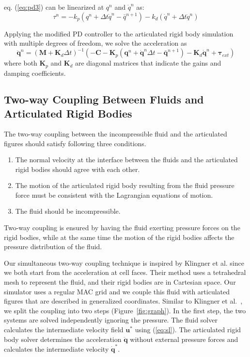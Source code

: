 eq. (\ref{eq:pd3}) can be linearized at $q^n$ and $\dot{q}^n$ as:
\begin{displaymath}
\tau^n=-k_p(q^n+\Delta t\dot{q}^n-\bar{q}^{n+1})-k_d(\dot{q}^n+\Delta t\ddot{q}^n)
\end{displaymath}

Applying the modified PD controller to the articulated rigid body simulation with multiple degrees of freedom, we solve the acceleration as
\begin{displaymath}
\label{eq:modifiedDynamics}
\mathbf{\ddot{q}}^n=(\mathbf{M}+\mathbf{K}_d\Delta t)^{-1}(-\mathbf{C}-\mathbf{K}_p(\mathbf{q}^n+\mathbf{\dot{q}}^n\Delta t-\bar{\mathbf{q}}^{n+1})-\mathbf{K}_d\mathbf{\dot{q}}^n+\mathbf{\tau}_{ext})
\end{displaymath}
where both $\mathbf{K}_p$ and $\mathbf{K}_d$ are diagonal matrices that indicate the gains and damping coefficients.

\subsection{Two-way Coupling Between Fluids and Articulated Rigid Bodies}
The two-way coupling between the incompressible fluid and the articulated figures should satisfy following three conditions.
\begin{enumerate}
\item The normal velocity at the interface between the fluids and the
articulated rigid bodies should agree with each other.
\item The motion of the articulated rigid body resulting from the fluid
pressure force must be consistent with the Lagrangian equations of motion.
\item The fluid should be incompressible.
\end{enumerate}

Two-way coupling is ensured by having the fluid exerting pressure forces
on the rigid bodies, while at the same time the motion of the rigid bodies
affects the pressure distribution of the fluid.

Our simultaneous two-way coupling technique is inspired by Klingner et al.
\cite{klingner2006mesh} since we both start from the acceleration at
cell faces.  Their method uses a tetrahedral mesh to represent the fluid,
and their rigid bodies are in Cartesian space.  Our simulator uses a
regular MAC grid and we couple this fluid with articulated figures that
are described in generalized coordinates.  Similar to Klingner et
al.~\cite{klingner2006mesh}, we split the coupling into two steps
(Figure~\ref{fig:graph}). In the first step, the two systems are solved
independently ignoring the pressure. The fluid solver calculates the
intermediate velocity field $\mathbf{u}^*$ using (\ref{eq:sl}). The articulated
rigid body solver determines the acceleration $\mathbf{\ddot{q}}$ without
external pressure forces and calculates the intermediate velocity
$\mathbf{\dot{q}}^*$.

